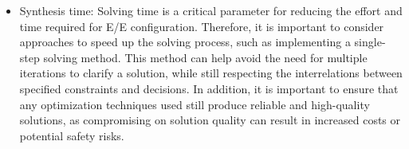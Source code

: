\begin{itemize}


    
    
    
    \item Synthesis time: %
     Solving time is a critical parameter for reducing the effort and time required for E/E configuration. Therefore, it is important to consider approaches to speed up the solving process, such as implementing a single-step solving method. This method can help avoid the need for multiple iterations to clarify a solution, while still respecting the interrelations between specified constraints and decisions. In addition, it is important to ensure that any optimization techniques used still produce reliable and high-quality solutions, as compromising on solution quality can result in increased costs or potential safety risks.
     

\end{itemize}
